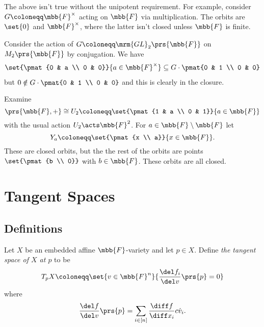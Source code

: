 \documentclass[10pt,a4paper,twoside,openany,hidelinks]{book}
\begin{document}
\begin{remark}
The above isn't true without the unipotent requirement.
For example, consider $G \coloneqq \mbb{F}^\times$ acting on $\mbb{F}$ via multiplication.
The orbits are $\set{0}$ and $\mbb{F}^\times$, where the latter isn't closed unless $\mbb{F}$ is finite.
\end{remark}

\begin{example}
Consider the action of $G \coloneqq \mrm{GL}_2\prs{\mbb{F}}$ on $M_2\prs{\mbb{F}}$ by conjugation. We have
\begin{align*}
\set{\pmat{0 & a \\ 0 & 0}}{a \in \mbb{F}^{\times}} \subseteq G \cdot \pmat{0 & 1 \\ 0 & 0}
\end{align*}
but $0 \notin G \cdot \pmat{0 & 1 \\ 0 & 0}$ and this is clearly in the closure.
\end{example}

\begin{example}
Examine
\[\prs{\mbb{F}, +} \cong U_2 \coloneqq \set{\pmat{1 & a \\ 0 & 1}}{a \in \mbb{F}}\]
with the usual action $U_2 \acts \mbb{F}^2$.
For $a \in \mbb{F} \setminus \mbb{F}$ let
\[Y_a \coloneqq \set{\pmat{x \\ a}}{x \in \mbb{F}} \text{.}\]
These are closed orbits, but the the rest of the orbits are points $\set{\pmat{b \\ 0}}$ with $b \in \mbb{F}$. These orbits are all closed.
\end{example}

\section{Tangent Spaces}

\subsection{Definitions}

\begin{definition}
Let $X$ be an embedded affine $\mbb{F}$-variety and let $p \in X$.
Define \emph{the tangent space of $X$ at $p$} to be
\begin{align*}
T_p X \coloneqq \set{v \in \mbb{F}^n}{\frac{\del f_i}{\del v} \prs{p} = 0}
\end{align*}
where
\[\frac{\del f}{\del v}\prs{p} = \sum_{i \in [n]} \frac{\diff f}{\diff x_i} c\dot v_i \text{.}\]
\end{definition}
\end{document}
